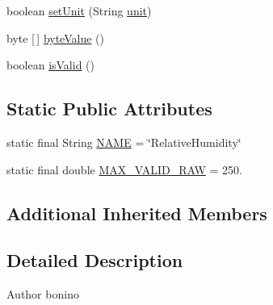 \begin{DoxyCompactItemize}
\item 
boolean \hyperlink{classit_1_1polito_1_1elite_1_1enocean_1_1enj_1_1eep_1_1eep26_1_1attributes_1_1_e_e_p26_humidity_linear_aa11f47cf68a7237efba413573ac6ba58}{set\+Unit} (String \hyperlink{classit_1_1polito_1_1elite_1_1enocean_1_1enj_1_1eep_1_1_e_e_p_attribute_a3fe5b3d613c30066354ad66eeb23b8ae}{unit})
\item 
byte \mbox{[}$\,$\mbox{]} \hyperlink{classit_1_1polito_1_1elite_1_1enocean_1_1enj_1_1eep_1_1eep26_1_1attributes_1_1_e_e_p26_humidity_linear_aa15183588ead4173998da1a4495bbc50}{byte\+Value} ()
\item 
boolean \hyperlink{classit_1_1polito_1_1elite_1_1enocean_1_1enj_1_1eep_1_1eep26_1_1attributes_1_1_e_e_p26_humidity_linear_ad9c926847cee0fe8301dc4c55bd98793}{is\+Valid} ()
\end{DoxyCompactItemize}
\subsection*{Static Public Attributes}
\begin{DoxyCompactItemize}
\item 
static final String \hyperlink{classit_1_1polito_1_1elite_1_1enocean_1_1enj_1_1eep_1_1eep26_1_1attributes_1_1_e_e_p26_humidity_linear_a66828dbdd7f99280c67414a7375b48df}{N\+A\+ME} = \char`\"{}Relative\+Humidity\char`\"{}
\item 
static final double \hyperlink{classit_1_1polito_1_1elite_1_1enocean_1_1enj_1_1eep_1_1eep26_1_1attributes_1_1_e_e_p26_humidity_linear_ae938658231b3ada871622ffaedbf7b8c}{M\+A\+X\+\_\+\+V\+A\+L\+I\+D\+\_\+\+R\+AW} = 250.
\end{DoxyCompactItemize}
\subsection*{Additional Inherited Members}


\subsection{Detailed Description}
\begin{DoxyAuthor}{Author}
bonino 
\end{DoxyAuthor}


